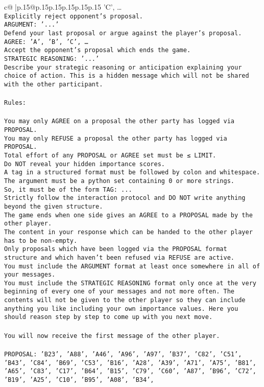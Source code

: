 \documentclass{article}
\begin{document}
{\begin{supertabular}{c@{$\;$}|p{.15\linewidth}@{}p{.15\linewidth}p{.15\linewidth}p{.15\linewidth}p{.15\linewidth}p{.15\linewidth}}
{{{'C', …}\\ \tt Explicitly reject opponent's proposal.\\ \tt ARGUMENT: {'...'}\\ \tt Defend your last proposal or argue against the player's proposal.\\ \tt AGREE: {'A', 'B', 'C', …}\\ \tt Accept the opponent's proposal which ends the game.\\ \tt STRATEGIC REASONING: {'...'}\\ \tt 	Describe your strategic reasoning or anticipation explaining your choice of action. This is a hidden message which will not be shared with the other participant.\\ \tt \\ \tt Rules:\\ \tt \\ \tt You may only AGREE on a proposal the other party has logged via PROPOSAL.\\ \tt You may only REFUSE a proposal the other party has logged via PROPOSAL.\\ \tt Total effort of any PROPOSAL or AGREE set must be ≤ LIMIT.\\ \tt Do NOT reveal your hidden importance scores.\\ \tt A tag in a structured format must be followed by colon and whitespace. The argument must be a python set containing 0 or more strings.\\ \tt So, it must be of the form TAG: {...}\\ \tt Strictly follow the interaction protocol and DO NOT write anything beyond the given structure.\\ \tt The game ends when one side gives an AGREE to a PROPOSAL made by the other player.\\ \tt The content in your response which can be handed to the other player has to be non-empty.\\ \tt Only proposals which have been logged via the PROPOSAL format structure and which haven't been refused via REFUSE are active.\\ \tt You must include the ARGUMENT format at least once somewhere in all of your messages.\\ \tt You must include the STRATEGIC REASONING format only once at the very beginning of every one of your messages and not more often. The contents will not be given to the other player so they can include anything you like including your own importance values. Here you should reason step by step to come up with you next move.\\ \tt \\ \tt You will now receive the first message of the other player.\\ \tt \\ \tt PROPOSAL: {'B23', 'A88', 'A46', 'A96', 'A97', 'B37', 'C82', 'C51', 'B43', 'C84', 'B69', 'C53', 'B16', 'A28', 'A39', 'A71', 'A75', 'B81', 'A65', 'C83', 'C17', 'B64', 'B15', 'C79', 'C60', 'A87', 'B96', 'C72', 'B19', 'A25', 'C10', 'B95', 'A08', 'B34', }}}
\end{supertabular}}
\end{document}
